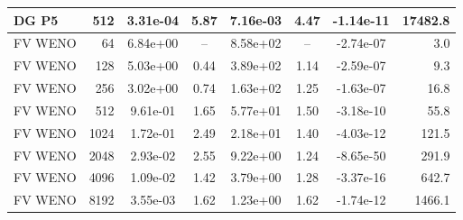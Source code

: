 \begin{tabular}{l r c c c c c r}
  DG P5 & 512 & 3.31e-04 & 5.87 & 7.16e-03 & 4.47 & -1.14e-11 & 17482.8 \\
\midrule
  FV WENO & 64 & 6.84e+00 & -- & 8.58e+02 & -- & -2.74e-07 & 3.0 \\
  FV WENO & 128 & 5.03e+00 & 0.44 & 3.89e+02 & 1.14 & -2.59e-07 & 9.3 \\
  FV WENO & 256 & 3.02e+00 & 0.74 & 1.63e+02 & 1.25 & -1.63e-07 & 16.8 \\
  FV WENO & 512 & 9.61e-01 & 1.65 & 5.77e+01 & 1.50 & -3.18e-10 & 55.8 \\
  FV WENO & 1024 & 1.72e-01 & 2.49 & 2.18e+01 & 1.40 & -4.03e-12 & 121.5 \\
  FV WENO & 2048 & 2.93e-02 & 2.55 & 9.22e+00 & 1.24 & -8.65e-50 & 291.9 \\
  FV WENO & 4096 & 1.09e-02 & 1.42 & 3.79e+00 & 1.28 & -3.37e-16 & 642.7 \\
  FV WENO & 8192 & 3.55e-03 & 1.62 & 1.23e+00 & 1.62 & -1.74e-12 & 1466.1 \\
\bottomrule
\end{tabular}
